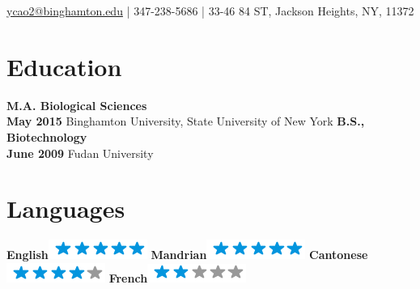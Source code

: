 \documentclass[]{friggeri-cv}
\begin{document}
{\href{mailto:ycao2@binghamton.edu}{ycao2@binghamton.edu} | 347-238-5686 |
33-46 84 ST, Jackson Heights, NY, 11372}

\hfill
\begin{aside}
	\section{Education}
		\textbf{M.A. Biological Sciences\\May 2015}
		{Binghamton University, State University of New York}
		\textbf{B.S., Biotechnology\\June 2009}
		{Fudan University}
	
  \section{Languages}
    \textbf{English}\includegraphics[scale=0.40]{img/5stars.png}
    \textbf{Mandrian}\includegraphics[scale=0.40]{img/5stars.png}
    \textbf{Cantonese}\includegraphics[scale=0.40]{img/4stars.png}
    \textbf{French}\includegraphics[scale=0.40]{img/2stars.png}
\end{aside}


\end{document}
